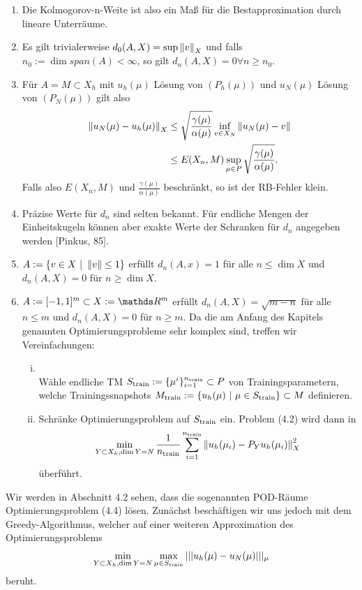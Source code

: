 \begin{enumerate}[(1)]
	\item Die Kolmogorov-n-Weite ist also ein Maß für die Bestapproximation durch lineare Unterräume.
	\item Es gilt trivialerweise $d_0(A,X)= \sup\limits\left\Vert v\right\Vert_X$ und falls $n_0:=\dim span(A) <\infty$, so gilt $d_n(A,X)=0 \forall n\ge n_0$.
	\item Für $A=M\subset X_h$ mit $u_h(\mu)$ Lösung von $(P_h(\mu))$ und $u_N(\mu)$ Lösung von $(P_N(\mu))$ gilt also
	\begin{align*}
	\left\Vert u_N(\mu)-u_h(\mu)\right\Vert_X &\le \sqrt{\frac{\gamma(\mu)}{\alpha(\mu)}} \inf\limits_{v\in X_N} \left\Vert u_N(\mu)-v\right\Vert\\
	&\le E(X_n,M) \sup\limits_{\mu\in P} \sqrt{\frac{\gamma(\mu)}{\alpha(\mu)}}.
	\end{align*}
	Falls also $E(X_n,M)$ und $\frac{\gamma(\mu)}{\alpha(\mu)}$ beschränkt, so ist der RB-Fehler klein.
	\item Präzise Werte für $d_n$ sind selten bekannt.
	Für endliche Mengen der Einheitskugeln können aber exakte Werte der Schranken für $d_n$ angegeben werden [Pinkus, 85].
	\item {} $A:=\left\{v\in X~|~\left\Vert v\right\Vert\le 1\right\}$ erfüllt $d_n(A,x)=1$ für alle $n\le \dim X$ und $d_n(A,X)=0$ für $n\ge \dim X$.
	\item {} $A:=[-1,1]^m\subset X:=\R^m$ erfüllt $d_n(A,X)=\sqrt{m-n}$ für alle $n\le m$ und $d_n(A,X) = 0$ für $n\ge m$.
	Da die am Anfang des Kapitels genannten Optimierungsprobleme sehr komplex sind, treffen wir Vereinfachungen:
	\begin{enumerate}[(i)]
		\item {}\\
		Wähle endliche TM $S_{\operatorname{train}}:=\{\mu^i\}_{i=1}^{n_{\operatorname{train}}} \subset P$ von Trainingsparametern, welche Trainingssnapshots $M_{\operatorname{train}} := \left\{u_h(\mu)~|~\mu\in S_{\operatorname{train}}\right\}\subset M$ definieren.
		\item Schränke Optimierungsproblem auf $S_{\operatorname{train}}$ ein.
		Problem (4.2) wird dann in 
		\begin{align}
		\min\limits_{Y\subset X_h, \dim Y = N} \frac{1}{n_{\operatorname{train}}} \sum_{i=1}^{n_{\operatorname{train}}} \left\Vert u_h(\mu_i)-P_Y u_h(\mu_i)\right\Vert^2_X
		\end{align}
		überführt.
	\end{enumerate}
\end{enumerate}
Wir werden in Abschnitt 4.2 sehen, dass die sogenannten POD-Räume Optimierungsproblem (4.4) lösen.
Zunächst beschäftigen wir uns jedoch mit dem Greedy-Algorithmus, welcher auf einer weiteren Approximation des Optimierungsproblems
\begin{align}
\min\limits_{Y\subset X_h, \dim Y = N} \max\limits_{\mu\in S_{\operatorname{train}}} |||u_h(\mu)-u_N(\mu)|||_\mu
\end{align}
beruht.

